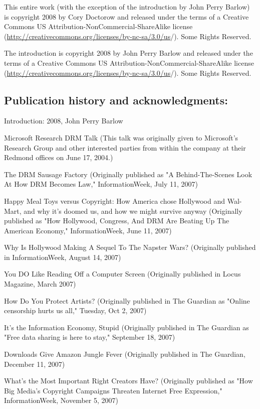 This entire work (with the exception of the introduction by John
Perry Barlow) is copyright 2008 by Cory Doctorow and released under
the terms of a Creative Commons US
Attribution-NonCommercial-ShareAlike license
(\href{http://creativecommons.org/licenses/by-nc-sa/3.0/us}{http://creativecommons.org/licenses/by-nc-sa/3.0/us}/).
Some Rights Reserved.

The introduction is copyright 2008 by John Perry Barlow and
released under the terms of a Creative Commons US
Attribution-NonCommercial-ShareAlike license
(\href{http://creativecommons.org/licenses/by-nc-sa/3.0/us}{http://creativecommons.org/licenses/by-nc-sa/3.0/us}/).
Some Rights Reserved.

\subsection{Publication history and acknowledgments:}

Introduction: 2008, John Perry Barlow

Microsoft Research DRM Talk (This talk was originally given to
Microsoft's Research Group and other interested parties from within
the company at their Redmond offices on June 17, 2004.)

The DRM Sausage Factory (Originally published as "A
Behind-The-Scenes Look At How DRM Becomes Law," InformationWeek,
July 11, 2007)

Happy Meal Toys versus Copyright: How America chose Hollywood and
Wal-Mart, and why it's doomed us, and how we might survive anyway
(Originally published as "How Hollywood, Congress, And DRM Are
Beating Up The American Economy," InformationWeek, June 11, 2007)

Why Is Hollywood Making A Sequel To The Napster Wars? (Originally
published in InformationWeek, August 14, 2007)

You DO Like Reading Off a Computer Screen (Originally published in
Locus Magazine, March 2007)

How Do You Protect Artists? (Originally published in The Guardian
as "Online censorship hurts us all," Tuesday, Oct 2, 2007)

It's the Information Economy, Stupid (Originally published in The
Guardian as "Free data sharing is here to stay," September 18,
2007)

Downloads Give Amazon Jungle Fever (Originally published in The
Guardian, December 11, 2007)

What's the Most Important Right Creators Have? (Originally
published as "How Big Media's Copyright Campaigns Threaten Internet
Free Expression," InformationWeek, November 5, 2007)

